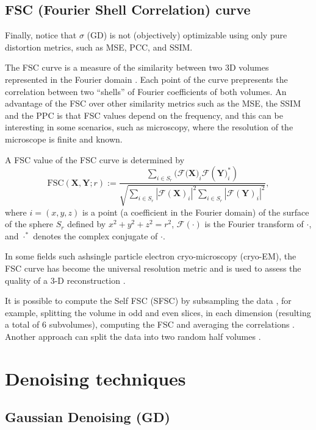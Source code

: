 \documentclass{article}
\begin{document}
\subsection{FSC (Fourier Shell Correlation) curve}

Finally, notice that $\sigma$ (GD) is not (objectively) optimizable using
only pure distortion metrics, such as MSE, PCC, and SSIM.

The FSC curve is a measure of the similarity between two 3D volumes
represented in the Fourier domain \cite{verbeke2024self}. Each point
of the curve prepresents the correlation between two ``shells'' of
Fourier coefficients of both volumes. An advantage of the FSC over
other similarity metrics such as the MSE, the SSIM and the PPC is that
FSC values depend on the frequency, and this can be interesting in
some scenarios, such as microscopy, where the resolution of the
microscope is finite and known.

A FSC value of the FSC curve is determined by~\cite{verbeke2024self}
\begin{equation}
\text{FSC}(\mathbf{X}, \mathbf{Y}; r) := \frac{\sum_{i \in S_r} (\mathcal{F}(\mathbf{X)}_i \mathcal{F}(\mathbf{Y)}_i^*)}{\sqrt{\sum_{i \in S_r} |\mathcal{F}(\mathbf{X})_i|^2 \sum_{i \in S_r} |\mathcal{F}(\mathbf{Y})_i|^2}},
\end{equation}
where $i=(x, y, z)$ is a point (a coefficient in the Fourier domain)
of the surface of the sphere $S_r$ defined by $x^2+y^2+z^2=r^2$,
$\mathcal{F}(\cdot)$ is the Fourier transform of $\cdot$, and
$\cdot^*$ denotes the complex conjugate of $\cdot$.

In some fields such ashsingle particle electron cryo-microscopy
(cryo-EM), the FSC curve has become the universal resolution metric
and is used to assess the quality of a 3-D reconstruction
\cite{rosenthal2003optimal,scheres2012prevention}.

It is possible to compute the Self FSC (SFSC) by subsampling the data
\cite{koho2019fourier}, for example, splitting the volume in odd and
even slices, in each dimension (resulting a total of 6 subvolumes),
computing the FSC and averaging the correlations
\cite{verbeke2024self}. Another approach can split the data into two
random half volumes \cite{verbeke2024self}.

\section{Denoising techniques}

\subsection{Gaussian Denoising (GD)}
\end{document}
